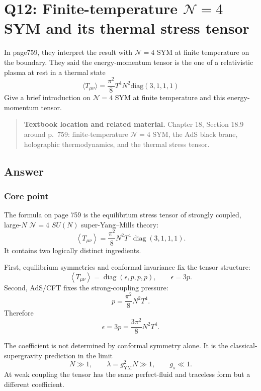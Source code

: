 \documentclass[
  10pt,
  a4paper,
  openany]{book}
\begin{document}
\section{\texorpdfstring{Q12: Finite-temperature \(\mathcal N=4\) SYM
and its thermal stress
tensor}{Q12: Finite-temperature \textbackslash mathcal N=4 SYM and its thermal stress tensor}}\label{q12-finite-temperature-mathcal-n4-sym-and-its-thermal-stress-tensor}

In page759, they interpret the result with \(\mathcal{N}=4\) SYM at
finite temperature on the boundary. They said the energy-momentum tensor
is the one of a relativistic plasma at rest in a thermal state \[
\langle T_{\mu \nu}\rangle=\frac{\pi^2}{8}T^4N^2 \mathrm{diag}(3,1,1,1)
\] Give a brief introduction on \(\mathcal{N}=4\) SYM at finite
temperature and this energy-momentum tensor.

\begin{quote}
\textbf{Textbook location and related material.} Chapter 18, Section
18.9 around p.~759: finite-temperature \(\mathcal N=4\) SYM, the AdS
black brane, holographic thermodynamics, and the thermal stress tensor.
\end{quote}

\subsection{Answer}\label{answer-47}

\subsubsection{Core point}\label{core-point-47}

The formula on page 759 is the equilibrium stress tensor of strongly
coupled, large-\(N\) \(\mathcal N=4\) \(SU(N)\) super-Yang--Mills
theory: \[
\boxed{
\left\langle T_{\mu\nu}\right\rangle
=
\frac{\pi^2}{8}N^2T^4
\operatorname{diag}(3,1,1,1)
}.
\] It contains two logically distinct ingredients.

First, equilibrium symmetries and conformal invariance fix the tensor
structure: \[
\left\langle T_{\mu\nu}\right\rangle
=
\operatorname{diag}(\epsilon,p,p,p),
\qquad
\epsilon=3p.
\] Second, AdS/CFT fixes the strong-coupling pressure: \[
p
=\frac{\pi^2}{8}N^2T^4.
\] Therefore \[
\epsilon
=3p
=\frac{3\pi^2}{8}N^2T^4.
\]

The coefficient is not determined by conformal symmetry alone. It is the
classical-supergravity prediction in the limit \[
N\gg1,
\qquad
\lambda=g_{\mathrm{YM}}^2N\gg1,
\qquad
g_s\ll1.
\] At weak coupling the tensor has the same perfect-fluid and traceless
form but a different coefficient.
\end{document}
